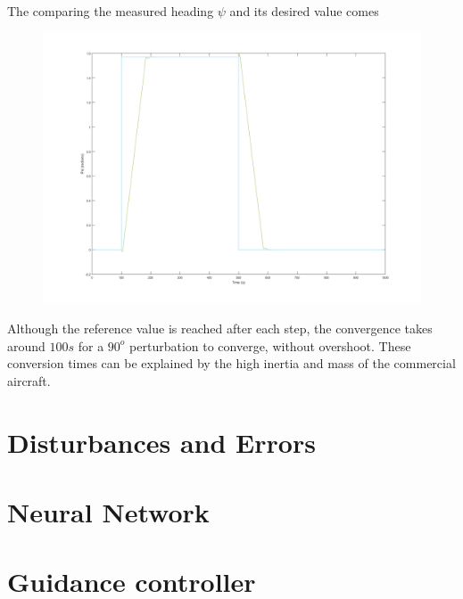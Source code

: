 The comparing the measured heading $\psi$ and its desired value comes 
\begin{figure}[h]
\centering
\includegraphics[width=\textwidth]{Figures/Results/heading_test.png}
\caption[]{}
\label{fig:heading_test}
\end{figure}

Although the reference value is reached after each step, the convergence takes around $100s$ for a $90^o$ perturbation to converge, without overshoot. These conversion times can be explained by the high inertia and mass of the commercial aircraft.
\section{Disturbances and Errors}
\label{section:results/disturbances_errors}


\section{Neural Network}
\label{section:results/NN}

\section{Guidance controller}
\label{section:results/guidance_control}


